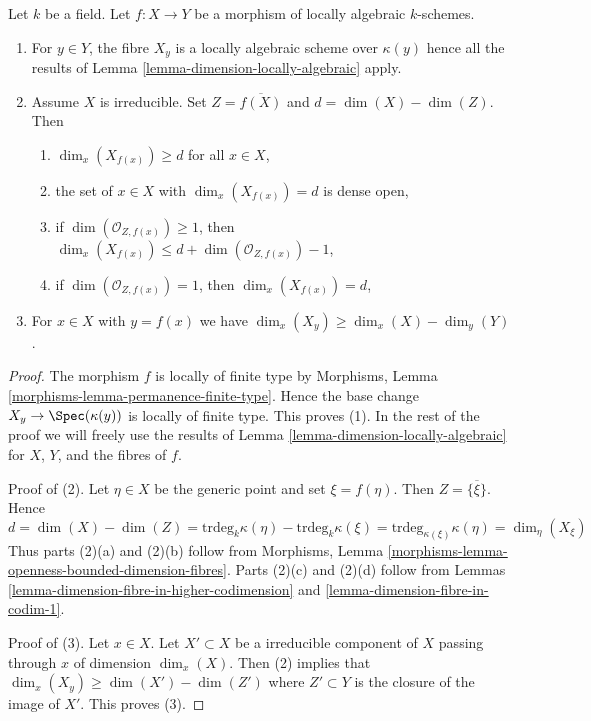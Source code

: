 \begin{lemma}
\label{lemma-dimension-fibres-locally-algebraic}
Let $k$ be a field. Let $f : X \to Y$ be a morphism of locally algebraic
$k$-schemes.
\begin{enumerate}
\item For $y \in Y$, the fibre $X_y$ is a locally
algebraic scheme over $\kappa(y)$ hence all the results of
Lemma \ref{lemma-dimension-locally-algebraic} apply.
\item Assume $X$ is irreducible. Set $Z = \overline{f(X)}$ and
$d = \dim(X) - \dim(Z)$. Then
\begin{enumerate}
\item $\dim_x(X_{f(x)}) \geq d$ for all $x \in X$,
\item the set of $x \in X$ with $\dim_x(X_{f(x)}) = d$ is dense open,
\item if $\dim(\mathcal{O}_{Z, f(x)}) \geq 1$, then
$\dim_x(X_{f(x)}) \leq d + \dim(\mathcal{O}_{Z, f(x)}) - 1$,
\item if $\dim(\mathcal{O}_{Z, f(x)}) = 1$, then $\dim_x(X_{f(x)}) = d$,
\end{enumerate}
\item For $x \in X$ with $y = f(x)$ we have
$\dim_x(X_y) \geq \dim_x(X) - \dim_y(Y)$.
\end{enumerate}
\end{lemma}

\begin{proof}
The morphism $f$ is locally of finite type by
Morphisms, Lemma \ref{morphisms-lemma-permanence-finite-type}.
Hence the base change $X_y \to \Spec(\kappa(y))$ is locally
of finite type. This proves (1).
In the rest of the proof we will freely use the results
of Lemma \ref{lemma-dimension-locally-algebraic} for $X$, $Y$, and
the fibres of $f$.

\medskip\noindent
Proof of (2). Let $\eta \in X$ be the generic point and set
$\xi = f(\eta)$. Then $Z = \overline{\{\xi\}}$. Hence
$$
d = \dim(X) - \dim(Z) =
\text{trdeg}_k \kappa(\eta) - \text{trdeg}_k \kappa(\xi) =
\text{trdeg}_{\kappa(\xi)} \kappa(\eta) = \dim_\eta(X_\xi)
$$
Thus parts (2)(a) and (2)(b) follow from
Morphisms, Lemma \ref{morphisms-lemma-openness-bounded-dimension-fibres}.
Parts (2)(c) and (2)(d) follow from
Lemmas \ref{lemma-dimension-fibre-in-higher-codimension} and
\ref{lemma-dimension-fibre-in-codim-1}.

\medskip\noindent
Proof of (3). Let $x \in X$. Let $X' \subset X$ be a irreducible component
of $X$ passing through $x$ of dimension $\dim_x(X)$. Then (2) implies that
$\dim_x(X_y) \geq \dim(X') - \dim(Z')$ where $Z' \subset Y$
is the closure of the image of $X'$. This proves (3).
\end{proof}

